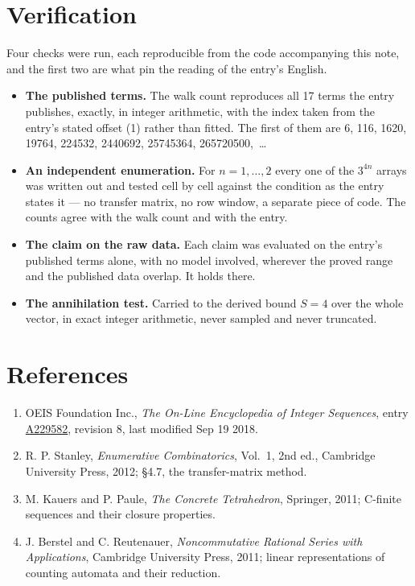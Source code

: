 \documentclass[11pt]{article}
\theoremstyle{definition}
\begin{document}
\section{Verification}

Four checks were run, each reproducible from the code accompanying this note, and the first two are what pin the reading of the entry's English.

\begin{itemize}

\item {\bfseries The published terms.} The walk count reproduces all 17 terms the entry publishes, exactly, in integer arithmetic, with the index taken from the entry's stated offset (1) rather than fitted. The first of them are 6, 116, 1620, 19764, 224532, 2440692, 25745364, 265720500,~\dots

\item {\bfseries An independent enumeration.} For $n = 1,\dots,2$ every one of the $3^{4n}$ arrays was written out and tested cell by cell against the condition as the entry states it --- no transfer matrix, no row window, a separate piece of code. The counts agree with the walk count and with the entry.

\item {\bfseries The claim on the raw data.} Each claim was evaluated on the entry's published terms alone, with no model involved, wherever the proved range and the published data overlap. It holds there.

\item {\bfseries The annihilation test.} Carried to the derived bound $S = 4$ over the whole vector, in exact integer arithmetic, never sampled and never truncated.

\end{itemize}

\section{References}

\begin{enumerate}

\item OEIS Foundation Inc., \emph{The On-Line Encyclopedia of Integer Sequences}, entry \href{https://oeis.org/A229582}{A229582}, revision 8, last modified Sep 19 2018.

\item R. P. Stanley, \emph{Enumerative Combinatorics}, Vol.~1, 2nd ed., Cambridge University Press, 2012; \S4.7, the transfer-matrix method.

\item M. Kauers and P. Paule, \emph{The Concrete Tetrahedron}, Springer, 2011; C-finite sequences and their closure properties.

\item J. Berstel and C. Reutenauer, \emph{Noncommutative Rational Series with Applications}, Cambridge University Press, 2011; linear representations of counting automata and their reduction.

\end{enumerate}
\end{document}
